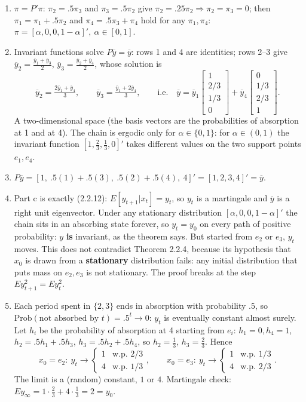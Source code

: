 \documentclass[12pt, letterpaper]{article}
\newcommand{\yb}{\overline{y}}
\begin{document}
\begin{tcolorbox}[evenbox,title={Exercise 2.18 \quad Random Walk}]
\begin{enumerate}
\item $\pi=P'\pi$: $\pi_2=.5\pi_3$ and $\pi_3=.5\pi_2$ give $\pi_2=.25\pi_2\Rightarrow\pi_2=\pi_3=0$;
then $\pi_1=\pi_1+.5\pi_2$ and $\pi_4=.5\pi_3+\pi_4$ hold for any $\pi_1,\pi_4$:
$\boxed{\pi=[\alpha,0,0,1-\alpha]',\ \alpha\in[0,1]}$.
\item Invariant functions solve $P\yb=\yb$: rows 1 and 4 are identities; rows 2--3 give
$\yb_2=\frac{\yb_1+\yb_3}{2}$, $\yb_3=\frac{\yb_2+\yb_4}{2}$, whose solution is
\[
\yb_2=\tfrac{2\yb_1+\yb_4}{3},\qquad \yb_3=\tfrac{\yb_1+2\yb_4}{3},
\qquad\text{i.e.}\quad \yb=\yb_1\begin{bmatrix}1\\2/3\\1/3\\0\end{bmatrix}+\yb_4\begin{bmatrix}0\\1/3\\2/3\\1\end{bmatrix}.
\]
A two-dimensional space (the basis vectors are the probabilities of absorption at 1 and at 4). The
chain is ergodic only for $\alpha\in\{0,1\}$: for $\alpha\in(0,1)$ the invariant function $[1,\frac23,\frac13,0]'$
takes different values on the two support points $e_1,e_4$.
\item $P\yb=[1,\ .5(1)+.5(3),\ .5(2)+.5(4),\ 4]'=\boxed{[1,2,3,4]'}=\yb$.
\item Part c is exactly (2.2.12): $E[y_{t+1}|x_t]=y_t$, so $y_t$ is a martingale and $\yb$ is a right unit
eigenvector. Under any stationary distribution $[\alpha,0,0,1-\alpha]'$ the chain sits in an absorbing
state forever, so $y_t=y_0$ on every path of positive probability: $y$ \textbf{is} invariant, as the
theorem says. But started from $e_2$ or $e_3$, $y_t$ moves. This does not contradict Theorem 2.2.4,
because its hypothesis that $x_0$ is drawn from a \textbf{stationary} distribution fails: any initial
distribution that puts mass on $e_2,e_3$ is not stationary. The proof breaks at the step
$Ey_{t+1}^2=Ey_t^2$.
\item Each period spent in $\{2,3\}$ ends in absorption with probability $.5$, so
$\text{Prob}(\text{not absorbed by }t)=.5^t\to0$: $y_t$ is eventually constant almost surely. Let
$h_i$ be the probability of absorption at 4 starting from $e_i$: $h_1=0,h_4=1$,
$h_2=.5h_1+.5h_3$, $h_3=.5h_2+.5h_4$, so $h_2=\frac13$, $h_3=\frac23$. Hence
\[
x_0=e_2:\ y_t\to\begin{cases}1&\text{w.p. }2/3\\4&\text{w.p. }1/3\end{cases},\qquad
x_0=e_3:\ y_t\to\begin{cases}1&\text{w.p. }1/3\\4&\text{w.p. }2/3\end{cases}.
\]
The limit is a (random) constant, $1$ or $4$. Martingale check: $E y_\infty=1\cdot\frac23+4\cdot\frac13=2=y_0$. \checkmark
\end{enumerate}


\end{tcolorbox}
\end{document}
